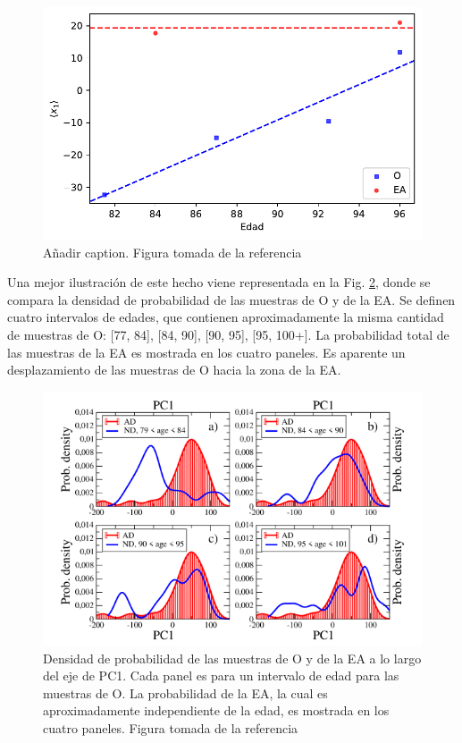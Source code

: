 \begin{figure}[!htb]
	\centering
	\includegraphics[width=0.75\linewidth]{figures/O_to_AD_1}
	\caption{\alert{Añadir caption}. Figura tomada de la referencia \cite{Gonzalez_2021}}
	\label{fig:otoad}
\end{figure}

Una mejor ilustración de este hecho viene representada en la Fig. \ref{fig:supplotoad}, donde se compara la densidad de probabilidad de las muestras de O y de la EA. Se definen cuatro intervalos de edades, que contienen aproximadamente la misma cantidad de muestras de O: [77, 84], [84, 90], [90, 95], [95, 100+]. La probabilidad total de las muestras de la EA es mostrada en los cuatro paneles. Es aparente un desplazamiento de las muestras de O hacia la zona de la EA.


\begin{figure}[!htb]
	\centering
	\includegraphics[width=0.75\linewidth]{figures/suppl_otoad.png}
	\caption{Densidad de probabilidad de las muestras de O y de la EA a lo largo del eje de PC1. Cada panel es para un intervalo de edad para las muestras de O. La probabilidad de la EA, la cual es aproximadamente independiente de la edad, es mostrada en los cuatro paneles. Figura tomada de la referencia \cite{Gonzalez_2021}}
	\label{fig:supplotoad}
\end{figure}

